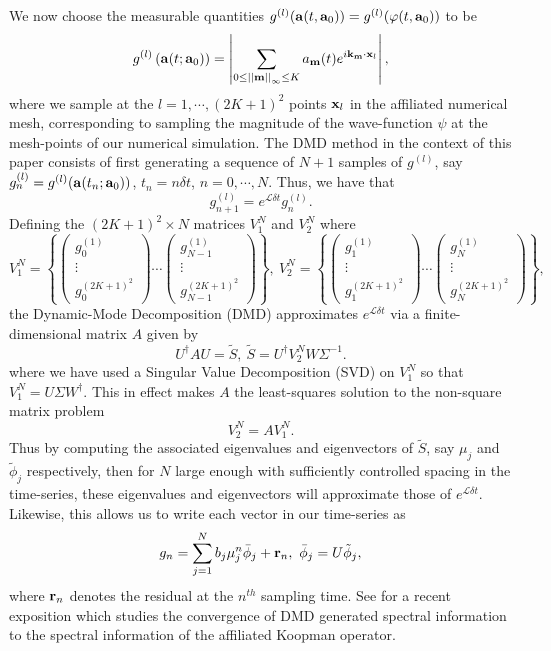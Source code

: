 \documentclass[aps,prl,preprint,groupedaddress]{revtex4-1}
\newcommand{\bp}{\begin{pmatrix}}
\newcommand{\ep}{\end{pmatrix}}
\newcommand{\gnorm}[1]{\left|\left| #1\right|\right|}
\begin{document}
We now choose the measurable quantities $g^{(l)}({\bf a}(t,{\bf a}_{0})) = g^{(l)}(\varphi(t,{\bf a}_{0}))$ to be 
\[
g^{(l)}\left({\bf a}(t;{\bf a}_{0})\right) = \left|\sum_{0\leq\gnorm{{\bf m}}_{\infty}\leq K}a_{{\bf m}}(t)e^{i{\bf k}_{{\bf m}}\cdot {\bf x}_{l}} \right|,
\]
where we sample at the $l=1, \cdots, (2K+1)^{2}$ points ${\bf x}_{l}$ in the affiliated numerical mesh, corresponding to sampling the magnitude of the wave-function $\psi$ at the mesh-points of our numerical simulation.  The DMD method in the context of this paper consists of first generating a sequence of $N+1$ samples of $g^{(l)}$, say $g^{(l)}_{n} = g^{(l)}({\bf a}(t_{n};{\bf a}_{0}))$, $t_{n}=n\delta t $, $n=0,\cdots,N$.   Thus, we have that 
\[
g^{(l)}_{n+1} = e^{\mathcal{L}\delta t} g^{(l)}_{n}.  
\] 
Defining the $(2K+1)^2\times N$ matrices $V_{1}^{N}$ and $V_{2}^{N}$ where 
\[
V^{N}_{1} = \left\{\bp g^{(1)}_{0} \\ \vdots \\ g^{(2K+1)^{2}}_{0}\ep \cdots \bp g^{(1)}_{N-1} \\ \vdots \\ g^{(2K+1)^{2}}_{N-1}\ep \right\}, ~ V^{N}_{2} = \left\{\bp g^{(1)}_{1} \\ \vdots \\ g^{(2K+1)^{2}}_{1}\ep \cdots \bp g^{(1)}_{N} \\ \vdots \\ g^{(2K+1)^{2}}_{N}\ep \right\},
\]
the Dynamic-Mode Decomposition (DMD) approximates $e^{\mathcal{L}\delta t}$ via a finite-dimensional matrix $A$ given by 
\[
U^{\dagger}AU = \tilde{S}, ~ \tilde{S} = U^{\dagger}V_{2}^{N}W\Sigma^{-1}.
\]
where we have used a Singular Value Decomposition (SVD) on $V_{1}^{N}$ so that $V_{1}^{N} = U\Sigma W^{\dagger}$.  This in effect makes $A$ the least-squares solution to the non-square matrix problem 
\[
V_{2}^{N}=AV_{1}^{N}.  
\]
Thus by computing the associated eigenvalues and eigenvectors of $\tilde{S}$, say $\mu_{j}$ and $\tilde{\phi}_{j}$ respectively, then for $N$ large enough with sufficiently controlled spacing in the time-series, these eigenvalues and eigenvectors will approximate those of $e^{\mathcal{L}\delta t}$.  Likewise, this allows us to write each vector in our time-series as 
\[
g_{n} = \sum_{j=1}^{N} b_{j}\mu_{j}^{n} \bar{\phi}_{j} + {\bf r}_{n}, ~ \bar{\phi}_{j} = U \tilde{\phi}_{j},
\]
where ${\bf r}_{n}$ denotes the residual at the $n^{th}$ sampling time.  See \cite{mezic2} for a recent exposition which studies the convergence of DMD generated spectral information to the spectral information of the affiliated Koopman operator.  
\end{document}
